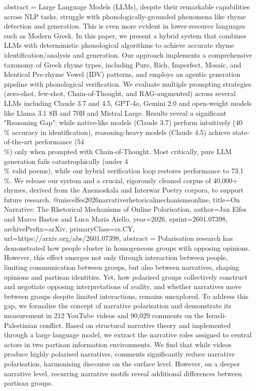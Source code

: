 {      abstract = {Large Language Models (LLMs), despite their remarkable capabilities across NLP tasks, struggle with phonologically-grounded phenomena like rhyme detection and generation. This is even more evident in lower-resource languages such as Modern Greek. In this paper, we present a hybrid system that combines LLMs with deterministic phonological algorithms to achieve accurate rhyme identification/analysis and generation. Our approach implements a comprehensive taxonomy of Greek rhyme types, including Pure, Rich, Imperfect, Mosaic, and Identical Pre-rhyme Vowel (IDV) patterns, and employs an agentic generation pipeline with phonological verification. We evaluate multiple prompting strategies (zero-shot, few-shot, Chain-of-Thought, and RAG-augmented) across several LLMs including Claude 3.7 and 4.5, GPT-4o, Gemini 2.0 and open-weight models like Llama 3.1 8B and 70B and Mistral Large. Results reveal a significant "Reasoning Gap": while native-like models (Claude 3.7) perform intuitively (40\\\% accuracy in identification), reasoning-heavy models (Claude 4.5) achieve state-of-the-art performance (54\\\%) only when prompted with Chain-of-Thought. Most critically, pure LLM generation fails catastrophically (under 4\\\% valid poems), while our hybrid verification loop restores performance to 73.1\\\%. We release our system and a crucial, rigorously cleaned corpus of 40,000+ rhymes, derived from the Anemoskala and Interwar Poetry corpora, to support future research.}
}@misc{elfes2026narrativerhetoricalmechanismsonline,
      title={On Narrative: The Rhetorical Mechanisms of Online Polarisation}, 
      author={Jan Elfes and Marco Bastos and Luca Maria Aiello},
      year={2026},
      eprint={2601.07398},
      archivePrefix={arXiv},
      primaryClass={cs.CY},
      url={https://arxiv.org/abs/2601.07398},
      abstract = {Polarisation research has demonstrated how people cluster in homogeneous groups with opposing opinions. However, this effect emerges not only through interaction between people, limiting communication between groups, but also between narratives, shaping opinions and partisan identities. Yet, how polarised groups collectively construct and negotiate opposing interpretations of reality, and whether narratives move between groups despite limited interactions, remains unexplored. To address this gap, we formalise the concept of narrative polarisation and demonstrate its measurement in 212 YouTube videos and 90,029 comments on the Israeli-Palestinian conflict. Based on structural narrative theory and implemented through a large language model, we extract the narrative roles assigned to central actors in two partisan information environments. We find that while videos produce highly polarised narratives, comments significantly reduce narrative polarisation, harmonising discourse on the surface level. However, on a deeper narrative level, recurring narrative motifs reveal additional differences between partisan groups.}
}
